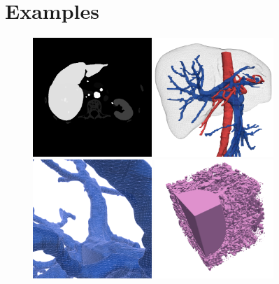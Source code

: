 
\section{Examples}\label{sec:examples}

\begin{figure}
\centering
\includegraphics[width=0.40\textwidth]{figs/ircad01_segmentation_65.png}
\includegraphics[width=0.40\textwidth]{figs/ircad01_liver_tricolore_01.png}
\includegraphics[width=0.40\textwidth]{figs/ircad01_porta_blue_01.png}
\includegraphics[width=0.40\textwidth]{figs/nrn10_200_pink_02.png}

\end{figure}
